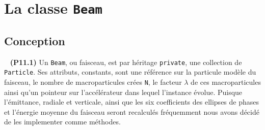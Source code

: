 \documentclass[12pt, letterpaper, twoside]{article}
\newcommand{\T}[1]{\texttt{#1}}
\begin{document}
\section{La classe \T{Beam}}

\subsection{Conception}

\ \linebreak
\noindent \textbf{(P11.1)} Un \T{Beam}, ou faisceau, est par héritage \T{private}, une collection de \T{Particle}. Ses attributs, constants, sont une référence sur la particule modèle du faisceau, le nombre de macroparticules crées \T{N}, le facteur $\lambda$ de ces macroparticules ainsi qu'un pointeur sur l'accélérateur dans lequel l'instance évolue. Puisque l'émittance, radiale et verticale, ainsi que les six coefficients des ellipses de phases et l'énergie moyenne du faisceau seront recalculés fréquemment nous avons décidé de les implementer comme méthodes. 
\end{document}
